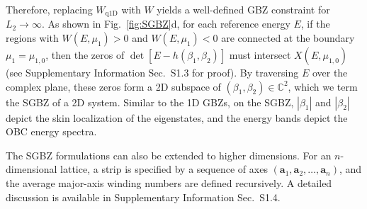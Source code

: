 \documentclass[pdflatex,sn-nature,iicol]{sn-jnl}
\theoremstyle{thmstyleone}%
\theoremstyle{thmstyletwo}%
\theoremstyle{thmstylethree}%
\begin{document}
Therefore, replacing $W_{\text{q1D}}$ with $W$ yields a well-defined GBZ constraint for $L_2 \rightarrow \infty$. 
As shown in Fig.~\ref{fig:SGBZ}d, for each reference energy $E$, if the regions with $W(E,\mu_1)>0$ and $W(E,\mu_1)<0$ are connected at the boundary $\mu_1 = \mu_{1,0}$, then the zeros of $\det[E-h(\beta_{1},\beta_{2})]$ must intersect $X(E,\mu_{1,0})$ (see Supplementary Information Sec.~S1.3 for proof).
By traversing $E$ over the complex plane, these zeros form a 2D subspace of $(\beta_1,\beta_2)\in \mathbb{C}^2$, which we term the SGBZ of a 2D system.
Similar to the 1D GBZs, on the SGBZ, $|\beta_1|$ and $|\beta_2|$ depict the skin localization of the eigenstates, and the energy bands depict the OBC energy spectra.

The SGBZ formulations can also be extended
to higher dimensions. For an $n$-dimensional lattice, a strip is
specified by a sequence of axes $(\mathbf{a}_{1},\mathbf{a}_{2},\dots,\mathbf{a}_{n})$,
and the  average major-axis winding numbers are defined recursively. A detailed
discussion is available in Supplementary Information Sec.~S1.4.
\end{document}
